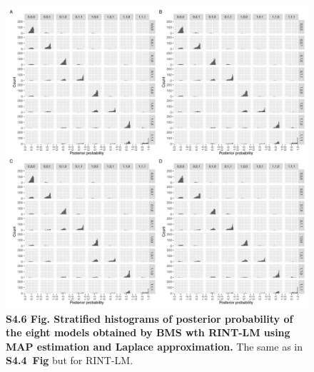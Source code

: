\documentclass[11pt]{article}
\newcommand{\sfighistmapnl}{\textbf{S4.4~Fig}\xspace}
\begin{document}
\begin{figure}[!ht]
\begin{center}
  \includegraphics[width=1\textwidth]{png/sim_hist_map_lap_rint.png}
\end{center}  
\caption{
  {\bf
    S4.6 Fig.
    Stratified histograms of posterior probability of the eight models obtained by BMS wth RINT-LM using MAP estimation and Laplace approximation.}
The same as in \sfighistmapnl but for RINT-LM.
}
\label{s-fig:sim-hist-map-rint}
\end{figure}
\end{document}

